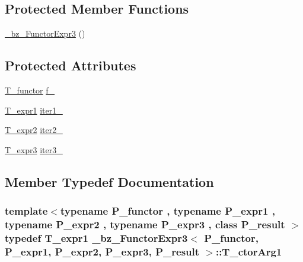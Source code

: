 \subsection*{Protected Member Functions}
\begin{DoxyCompactItemize}
\item 
\hyperlink{class__bz__FunctorExpr3_aa3751816e052237467e1b7416241b1b7}{\+\_\+bz\+\_\+\+Functor\+Expr3} ()
\end{DoxyCompactItemize}
\subsection*{Protected Attributes}
\begin{DoxyCompactItemize}
\item 
\hyperlink{class__bz__FunctorExpr3_aae81209846ad3b2cd702513067b9ef91}{T\+\_\+functor} \hyperlink{class__bz__FunctorExpr3_ae7c7a55ab842a31a57bc0ea42bb84030}{f\+\_\+}
\item 
\hyperlink{class__bz__FunctorExpr3_a39963d1b65dfb09899113c1bcd23aad2}{T\+\_\+expr1} \hyperlink{class__bz__FunctorExpr3_a3056f759a1b4e7a960d9e2e9413227f9}{iter1\+\_\+}
\item 
\hyperlink{class__bz__FunctorExpr3_a942c2f518fa860c92819e1fc7a916511}{T\+\_\+expr2} \hyperlink{class__bz__FunctorExpr3_af66441a015022c06c5dcbe3ff0cb4907}{iter2\+\_\+}
\item 
\hyperlink{class__bz__FunctorExpr3_a490ef6e4c6ad6c4409b53142860ebaa5}{T\+\_\+expr3} \hyperlink{class__bz__FunctorExpr3_a27cdce9902cc1b453b91d1488d0ebbc8}{iter3\+\_\+}
\end{DoxyCompactItemize}


\subsection{Member Typedef Documentation}
\hypertarget{class__bz__FunctorExpr3_a27d00886f86094214cf7ac89fdeda5df}{}
\subsubsection[{T\+\_\+ctor\+Arg1}]{\setlength{\rightskip}{0pt plus 5cm}template$<$typename P\+\_\+functor , typename P\+\_\+expr1 , typename P\+\_\+expr2 , typename P\+\_\+expr3 , class P\+\_\+result $>$ typedef {\bf T\+\_\+expr1} {\bf \+\_\+bz\+\_\+\+Functor\+Expr3}$<$ P\+\_\+functor, P\+\_\+expr1, P\+\_\+expr2, P\+\_\+expr3, P\+\_\+result $>$\+::{\bf T\+\_\+ctor\+Arg1}}\label{class__bz__FunctorExpr3_a27d00886f86094214cf7ac89fdeda5df}
\hypertarget{class__bz__FunctorExpr3_acd52287918ba75a58a5e8da2a3ff9dc6}{}

